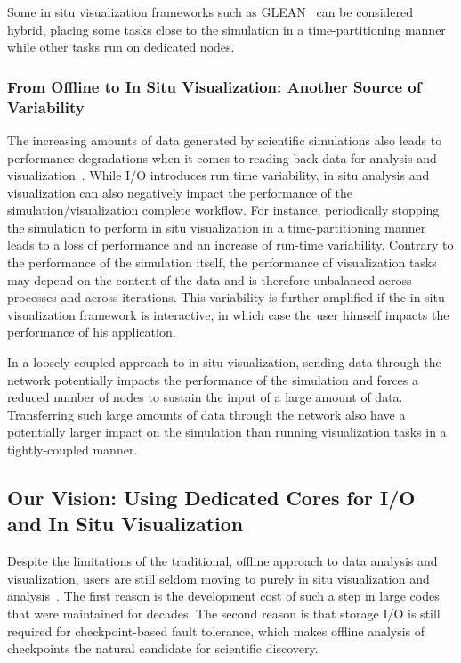		Some in situ visualization frameworks such as GLEAN~\cite{hereld2011toward} can be considered hybrid, placing
		some tasks close to the simulation in a time-partitioning manner while other tasks
		run on dedicated nodes.
	
	\subsubsection{From Offline to In Situ Visualization: Another Source of Variability}
	
		The increasing amounts of data generated by scientific simulations also leads to performance
		degradations when it comes to reading back data for analysis and visualization~\cite{childs2010extreme,yu2005study}.
		While I/O introduces run time variability, in situ analysis and visualization can also negatively impact
		the performance of the simulation/visualization complete workflow. 
		For instance, periodically stopping the simulation to perform in situ visualization in a time-partitioning manner
		leads to a loss of performance and an increase of run-time variability. 
		Contrary to the performance of the simulation itself,
		the performance of visualization tasks may depend on the
		content of the data and is therefore unbalanced across processes and across iterations.
		This variability is further amplified if the in situ visualization framework is interactive, in which case the user
		himself impacts the performance of his application.
	
		In a loosely-coupled approach to in situ visualization, sending data through the network potentially impacts the performance of
		the simulation and forces a reduced number of nodes to sustain the input of a large amount of data.
		Transferring such large amounts of data through the network also have a potentially larger
		impact on the simulation than running visualization tasks in a tightly-coupled manner.
		
\subsection{Our Vision: Using Dedicated Cores for I/O and In Situ Visualization}
	
		Despite the limitations of the traditional, offline approach to data analysis and visualization,
		users  are still seldom moving to purely in situ visualization and analysis~\cite{yu2010insitu,ma2007insitu,ma2009insitu}.
		The first reason is the development cost of such a step in large codes that were maintained for decades.
		The second reason is that storage I/O is still required for checkpoint-based fault tolerance, which makes
		offline analysis of checkpoints the natural candidate for scientific discovery.
			
